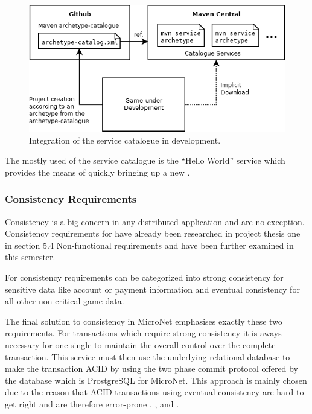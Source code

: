 \begin{figure}
	\centering
	\includegraphics[width=12cm]{images/architecture/ServiceCatalogue}
	\caption{Integration of the service catalogue in \og{} development.}
	\label{fig:service_catalogue}
\end{figure}

The \ms{} mostly used of the service catalogue is the ``Hello World''
service which provides the means of quickly bringing up a new \ms{}. 

\subsubsection{Consistency Requirements}

Consistency is a big concern in any distributed application and \ogs{} are no
exception. Consistency requirements for \ogs{} have already been researched in
project thesis one \cite{biedermann2015project1} in section 5.4 Non-functional
requirements and have been further examined in this semester.

For \ogs{} consistency requirements can be categorized into strong consistency
for sensitive data like account or payment information and eventual consistency
for all other non critical game data. 

The final solution to consistency in MicroNet emphasises exactly these two
requirements. For transactions which require strong consistency it is aways
necessary for one single \ms{} to maintain the overall control over the complete
transaction. This service must then use the underlying relational database to
make the transaction ACID by using the two phase commit protocol offered by the
database which is ProstgreSQL for MicroNet. This approach is mainly chosen due
to the reason that ACID transactions using eventual consistency are hard to get
right and are therefore error-prone \cite{zhang2011transaction},
\cite{zhang2008persistence}, and \cite{pardon2014atomic}.

